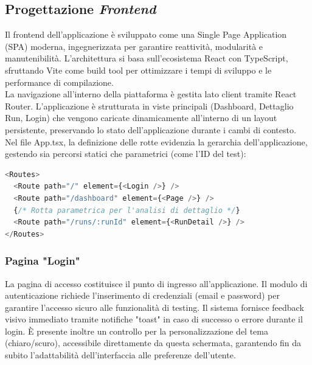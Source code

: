 \subsection{Progettazione \emph{Frontend}} 
Il frontend dell'applicazione è sviluppato come una Single Page Application (SPA) moderna, ingegnerizzata per garantire reattività, modularità e manutenibilità. L'architettura si basa sull'ecosistema React con TypeScript, sfruttando Vite come build tool per ottimizzare i tempi di sviluppo e le performance di compilazione.
\\
La navigazione all'interno della piattaforma è gestita lato client tramite React Router. L'applicazione è strutturata in viste principali (Dashboard, Dettaglio Run, Login) che vengono caricate dinamicamente all'interno di un layout persistente, preservando lo stato dell'applicazione durante i cambi di contesto.
\\ \newline
Nel file App.tsx, la definizione delle rotte evidenzia la gerarchia dell'applicazione, gestendo sia percorsi statici che parametrici (come l'ID del test):

\begin{lstlisting}[language=JavaScript, caption={Definizione delle rotte React}]
<Routes>
  <Route path="/" element={<Login />} />
  <Route path="/dashboard" element={<Page />} />
  {/* Rotta parametrica per l'analisi di dettaglio */}
  <Route path="/runs/:runId" element={<RunDetail />} /> 
</Routes>
\end{lstlisting}

\subsubsection{Pagina "Login"}

La pagina di accesso costituisce il punto di ingresso all'applicazione. Il modulo di autenticazione richiede l'inserimento di credenziali (email e password) per garantire l'accesso sicuro alle funzionalità di testing. Il sistema fornisce feedback visivo immediato tramite notifiche "toast" in caso di successo o errore durante il login. È presente inoltre un controllo per la personalizzazione del tema (chiaro/scuro), accessibile direttamente da questa schermata, garantendo fin da subito l'adattabilità dell'interfaccia alle preferenze dell'utente.


